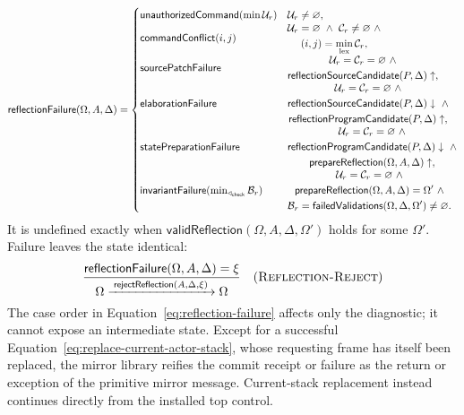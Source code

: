 {\small
\begin{equation}\label{eq:reflection-failure}
\mathsf{reflectionFailure}(\Omega,A,\Delta)=
\begin{cases}
 \mathsf{unauthorizedCommand}(\min\mathcal U_r)
   &\mathcal U_r\ne\varnothing,\\
 \mathsf{commandConflict}(i,j)
   &\begin{gathered}\mathcal U_r=\varnothing\ \land\
       \mathcal C_r\ne\varnothing\ \land\\
       (i,j)=\min_{\rm lex}\mathcal C_r,
    \end{gathered}\\
 \mathsf{sourcePatchFailure}
   &\begin{gathered}\mathcal U_r=\mathcal C_r=\varnothing\ \land\\
    \mathsf{reflectionSourceCandidate}(P,\Delta)\uparrow,
    \end{gathered}\\
 \mathsf{elaborationFailure}
   &\begin{gathered}\mathcal U_r=\mathcal C_r=\varnothing\ \land\\
    \mathsf{reflectionSourceCandidate}(P,\Delta)\downarrow\ \land\\
    \mathsf{reflectionProgramCandidate}(P,\Delta)\uparrow,
    \end{gathered}\\
 \mathsf{statePreparationFailure}
   &\begin{gathered}\mathcal U_r=\mathcal C_r=\varnothing\ \land\\
    \mathsf{reflectionProgramCandidate}(P,\Delta)\downarrow\ \land\\
    \mathsf{prepareReflection}(\Omega,A,\Delta)\uparrow,
    \end{gathered}\\
 \mathsf{invariantFailure}(\min_{\triangleleft_{\mathsf{check}}}\mathcal B_r)
   &\begin{gathered}\mathcal U_r=\mathcal C_r=\varnothing\ \land\\
    \mathsf{prepareReflection}(\Omega,A,\Delta)=\Omega'\ \land\\
    \mathcal B_r=\mathsf{failedValidations}(\Omega,\Delta,\Omega')
       \ne\varnothing.
    \end{gathered}
\end{cases}
\end{equation}
}
It is undefined exactly when
$\mathsf{validReflection}(\Omega,A,\Delta,\Omega')$ holds for some $\Omega'$.
Failure leaves the state identical:
\[
\dfrac{\mathsf{reflectionFailure}(\Omega,A,\Delta)=\xi}
 {\Omega\xrightarrow{\;\mathsf{rejectReflection}(A,\Delta,\xi)\;}\Omega}
\quad(\textsc{Reflection-Reject})
\]
The case order in Equation~\eqref{eq:reflection-failure} affects only the
diagnostic; it cannot expose an intermediate state.  Except for a successful
Equation~\eqref{eq:replace-current-actor-stack}, whose requesting frame has
itself been replaced, the mirror library reifies the commit receipt or failure
as the return or exception of the primitive mirror message.  Current-stack
replacement instead continues directly from the installed top control.

